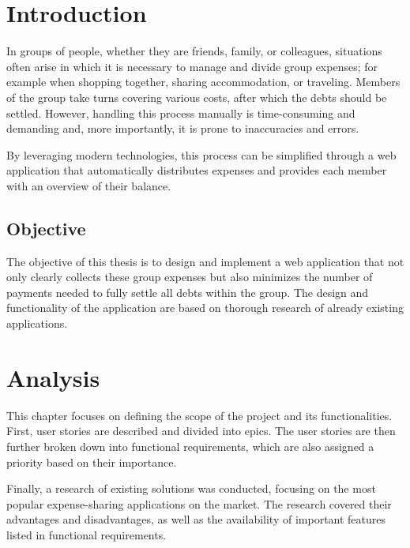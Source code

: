 \documentclass{ctuthesis}
\begin{document}
\maketitle

\chapter{Introduction}
In groups of people, whether they are friends, family, or colleagues, situations often arise in which it is necessary to manage and divide group expenses; for example when shopping together, sharing accommodation, or traveling. Members of the group take turns covering various costs, after which the debts should be settled. However, handling this process manually is time-consuming and demanding and, more importantly, it is prone to inaccuracies and errors.

By leveraging modern technologies, this process can be simplified through a web application that automatically distributes expenses and provides each member with an overview of their balance.

\section{Objective}
The objective of this thesis is to design and implement a web application that not only clearly collects these group expenses but also minimizes the number of payments needed to fully settle all debts within the group. The design and functionality of the application are based on thorough research of already existing applications.  

\chapter{Analysis}
This chapter focuses on defining the scope of the project and its functionalities. First, user stories are described and divided into epics. The user stories are then further broken down into functional requirements, which are also assigned a priority based on their importance. 

Finally, a research of existing solutions was conducted, focusing on the most popular expense-sharing applications on the market. The research covered their advantages and disadvantages, as well as the availability of important features listed in functional requirements.
\end{document}
